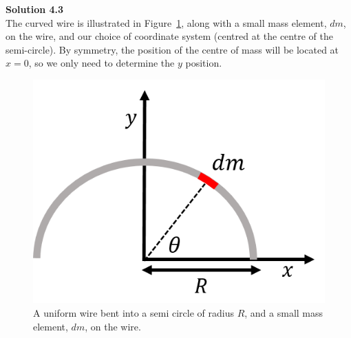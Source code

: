 \begin{framed}
\textbf{Solution 4.3}\\
The curved wire is illustrated in Figure~\ref{fig:momentumandcm:curvedwire}, along with a small mass element, $dm$, on the wire, and our choice of coordinate system (centred at the centre of the semi-circle). By symmetry, the position of the centre of mass will be located at $x=0$, so we only need to determine the $y$ position.

\begin{figure}[!htbp]
\centering
\includegraphics[width=0.4\linewidth]{files/curvedwire-99d938f2b3157166a4be5707dd9ea5b3.png}
\caption[]{A uniform wire bent into a semi circle of radius $R$, and a small mass element, $dm$, on the wire.}
\label{fig:momentumandcm:curvedwire}
\end{figure}


\end{framed}
